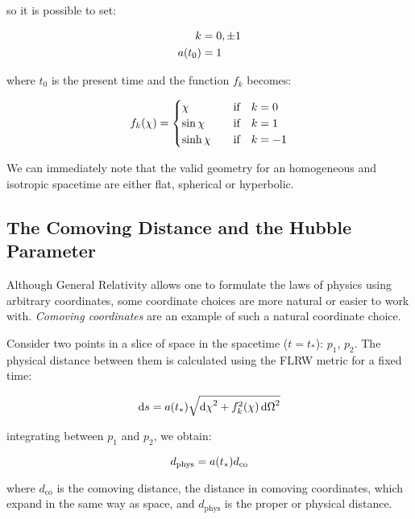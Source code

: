 so it is possible to set:

\begin{align}
k & = 0,\pm 1 \\
a\qty(t_0) & = 1
\end{align}

where $t_0$ is the present time and the function $f_k$ becomes:

        \begin{equation}
                f_k\qty(\chi) =
                        \begin{cases}
                                 \chi & \qif k = 0 \\
                                 \sin \chi & \qif k = 1 \\
                                 \sinh \chi & \qif k = -1
                        \end{cases}
        \end{equation}

We can immediately note that the valid geometry for an homogeneous
and isotropic spacetime are either flat, spherical or hyperbolic.

\subsection{The Comoving Distance and the Hubble Parameter}

Although General Relativity allows one to formulate the laws of physics
using arbitrary coordinates, some coordinate choices are more natural or
easier to work with. \emph{Comoving coordinates} are an example of such a
natural coordinate choice.

Consider two points in a slice of space in the spacetime ($t = t_*$): $p_1$,
$p_2$. The physical distance between them is calculated using the FLRW
metric for a fixed time:

\begin{equation}
        \dd{s} = a\qty(t_*)\sqrt{\dd{\chi}^2 +
        f_k^2\qty(\chi)\dd{\Omega}^2}
\end{equation}

integrating between $p_1$ and $p_2$, we obtain:

\begin{equation}
        d_{\text{phys}} = a\qty(t_*)d_{\text{co}}
        \label{eq:dd}
\end{equation}

where $d_{\text{co}}$ is the comoving distance, the distance in comoving
coordinates, which expand in the same way as space, and $d_\text{phys}$ is
the proper or physical distance.

